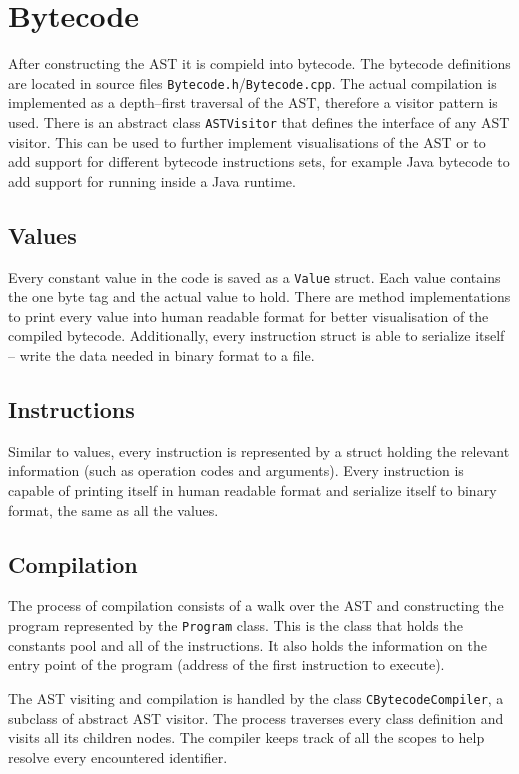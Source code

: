 \documentclass[thesis=M,english]{FITthesis}[2019/12/23]
\begin{document}
\section{Bytecode}
After constructing the AST it is compield into bytecode. The bytecode definitions are located in source files \texttt{Bytecode.h}/\texttt{Bytecode.cpp}. The actual
compilation is implemented as a depth--first traversal of the AST, therefore a visitor pattern is used. There is an abstract class \texttt{ASTVisitor} that defines
the interface of any AST visitor. This can be used to further implement visualisations of the AST or to add support for different bytecode instructions sets,
for example Java bytecode to add support for running inside a Java runtime.

\subsection{Values}
Every constant value in the code is saved as a \texttt{Value} struct. Each value contains the one byte tag and the actual value to hold. There are method implementations
to print every value into human readable format for better visualisation of the compiled bytecode. Additionally, every instruction struct is able to serialize itself -- 
write the data needed in binary format to a file.

\subsection{Instructions}
Similar to values, every instruction is represented by a struct holding the relevant information (such as operation codes and arguments). Every instruction is capable
of printing itself in human readable format and serialize itself to binary format, the same as all the values.

\subsection{Compilation}
The process of compilation consists of a walk over the AST and constructing the program represented by the \texttt{Program} class. This is the class that holds
the constants pool and all of the instructions. It also holds the information on the entry point of the program (address of the first instruction to execute).

The AST visiting and compilation is handled by the class \texttt{CBytecodeCompiler}, a subclass of abstract AST visitor. The process traverses every class definition
and visits all its children nodes. The compiler keeps track of all the scopes to help resolve every encountered identifier. 
\end{document}
